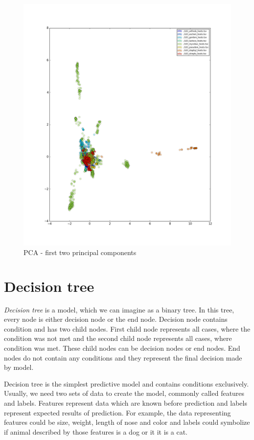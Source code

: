\begin{figure}[htp]
\includegraphics[width=\linewidth]{./images/pca.png}
\centering
\caption{PCA - first two principal components}
\end{figure}

\section{Decision tree}
\emph{Decision tree} is a model, which we can imagine as a binary tree.
In this tree, every node is either decision node or the end node.
Decision node contains condition and has two child nodes.
First child node represents all cases, where the condition was not met and the second child node represents all cases, where condition was met.
These child nodes can be decision nodes or end nodes.
End nodes do not contain any conditions and they represent the final decision made by model.

Decision tree is the simplest predictive model and contains conditions exclusively.
Usually, we need two sets of data to create the model, commonly called features and labels.
Features represent data which are known before prediction and labels represent expected results of prediction.
For example, the data representing features could be size, weight, length of nose and color and labels could symbolize if animal described by those features is a dog or it it is a cat.

